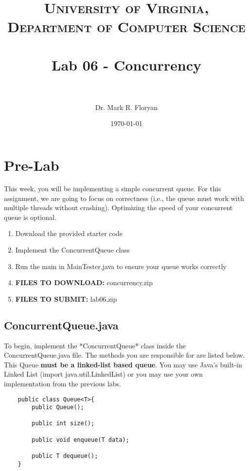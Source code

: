 \documentclass[paper=a4, fontsize=11pt, parskip=full]{scrartcl} %
\title{	
\normalfont \normalsize 
\textsc{University of Virginia, Department of Computer Science} \\ [25pt] %
\horrule{0.5pt} \\[0.4cm] %
\huge Lab 06 - Concurrency \\ %
\horrule{2pt} \\[0.5cm] %
}
\author{Dr. Mark R. Floryan} %
\date{\normalsize\today} %
\numberwithin{equation}{section} %
\numberwithin{figure}{section} %
\numberwithin{table}{section} %
\begin{document}
\maketitle %


\section{Pre-Lab}

This week, you will be implementing a simple concurrent queue. For this assignment, we are going to focus on correctness (i.e., the queue must work with multiple threads without crashing). Optimizing the speed of your concurrent queue is optional.

\begin{enumerate}
	\item Download the provided starter code
	\item Implement the ConcurrentQueue class
	\item Run the main in MainTester.java to ensure your queue works correctly
	\item \textbf{FILES TO DOWNLOAD:} concurrency.zip
	\item \textbf{FILES TO SUBMIT:} lab06.zip
\end{enumerate}


\subsection{ConcurrentQueue.java}

To begin, implement the *ConcurrentQueue* class inside the ConcurrentQueue.java file. The methods you are responsible for are listed below. This Queue \textbf{must be a linked-list based queue}. You may use Java's built-in Linked List (import java.util.LinkedList) or you may use your own implementation from the previous labs.

\begin{lstlisting}
	public class Queue<T>{
		public Queue();

		public int size();

		public void enqueue(T data);

		public T dequeue();
	}
\end{lstlisting}
\end{document}
